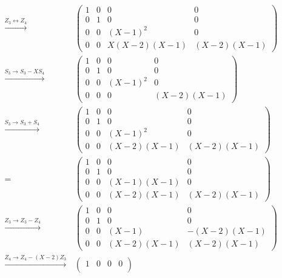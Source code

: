 \begin{align*}
  \\
  \xrightarrow{Z_3 \leftrightarrow Z_4}&\,
    \begin{pmatrix}
      1 & 0 &           0 &          0  \\
      0 & 1 &           0 &          0  \\
      0 & 0 &     (X-1)^2 &          0  \\
      0 & 0 & X(X-2)(X-1) & (X-2)(X-1)
    \end{pmatrix}
  \\
  \xrightarrow{S_3 \to S_3 - X S_4}&\,
    \begin{pmatrix}
      1 & 0 &       0 &          0  \\
      0 & 1 &       0 &          0  \\
      0 & 0 & (X-1)^2 &          0  \\
      0 & 0 &       0 & (X-2)(X-1)
    \end{pmatrix}
  \\
  \xrightarrow{S_3 \to S_3 + S_4}&\,
    \begin{pmatrix}
      1 & 0 &           0 &          0  \\
      0 & 1 &           0 &          0  \\
      0 & 0 &     (X-1)^2 &          0  \\
      0 & 0 &  (X-2)(X-1) & (X-2)(X-1)
    \end{pmatrix}
  \\
  =&\,
    \begin{pmatrix}
      1 & 0 &           0 &          0  \\
      0 & 1 &           0 &          0  \\
      0 & 0 &  (X-1)(X-1) &          0  \\
      0 & 0 &  (X-2)(X-1) & (X-2)(X-1)
    \end{pmatrix}
  \\
  \xrightarrow{Z_3 \to Z_3 - Z_4}&\,
    \begin{pmatrix}
      1 & 0 &           0 &          0  \\
      0 & 1 &           0 &          0  \\
      0 & 0 &       (X-1) & -(X-2)(X-1) \\
      0 & 0 &  (X-2)(X-1) &  (X-2)(X-1)
    \end{pmatrix}
  \\
  \xrightarrow{Z_4 \to Z_4 - (X-2) Z_3}&\,
    \begin{pmatrix}
      1 & 0 &     0 &                             0 \\

\end{pmatrix}
\end{align*}
